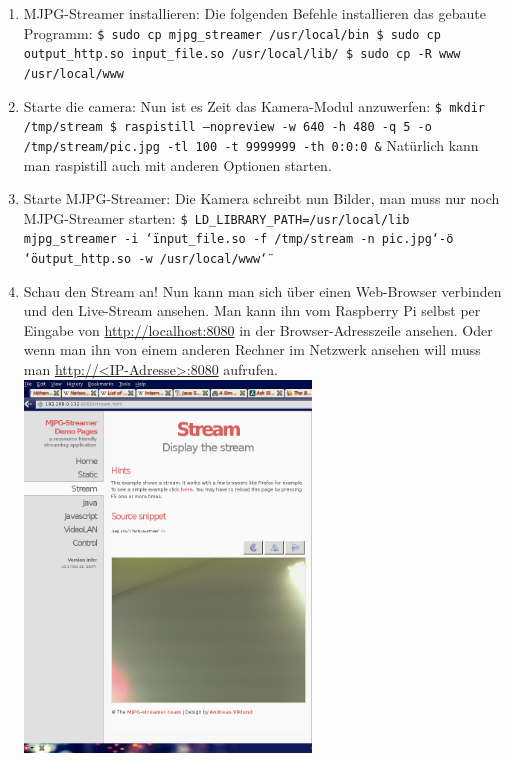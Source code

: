 \documentclass[12pt,a4paper,titlepage]{scrartcl} %
\begin{document}
\begin{enumerate}
\item MJPG-Streamer installieren:\newline
\textnormal{Die folgenden Befehle installieren das gebaute Programm:}\newline
\texttt{\$ sudo cp mjpg\_streamer /usr/local/bin\newline
\$ sudo cp output\_http.so input\_file.so /usr/local/lib/\newline
\$ sudo cp -R www /usr/local/www}

\item Starte die camera:\newline
\textnormal{Nun ist es Zeit das Kamera-Modul anzuwerfen:}\newline
\texttt{\$ mkdir /tmp/stream\newline
\$ raspistill --nopreview -w 640 -h 480 -q 5 -o /tmp/stream/pic.jpg -tl 100 -t 9999999 -th 0:0:0 \&}\newline
\textnormal{Natürlich kann man raspistill auch mit anderen Optionen starten.}

\item Starte MJPG-Streamer:\newline
\textnormal{Die Kamera schreibt nun Bilder, man muss nur noch MJPG-Streamer starten:}\newline
\texttt{\$ LD\_LIBRARY\_PATH=/usr/local/lib mjpg\_streamer -i \char`\"input\_file.so -f /tmp/stream -n pic.jpg\char`\" -o \char`\"output\_http.so -w /usr/local/www\char`\"} %

\item Schau den Stream an!\newline
\textnormal{Nun kann man sich über einen Web-Browser verbinden und den Live-Stream ansehen. Man kann ihn vom Raspberry Pi selbst per Eingabe von \url{http://localhost:8080} in der Browser-Adresszeile ansehen. Oder wenn man ihn von einem anderen Rechner im Netzwerk ansehen will muss man \url{http://<IP-Adresse>:8080} aufrufen.}\newline
	    \includegraphics[width=0.6\textwidth]{Streaming/MJPG-Streamer_cut}


\end{enumerate}
\end{document}
